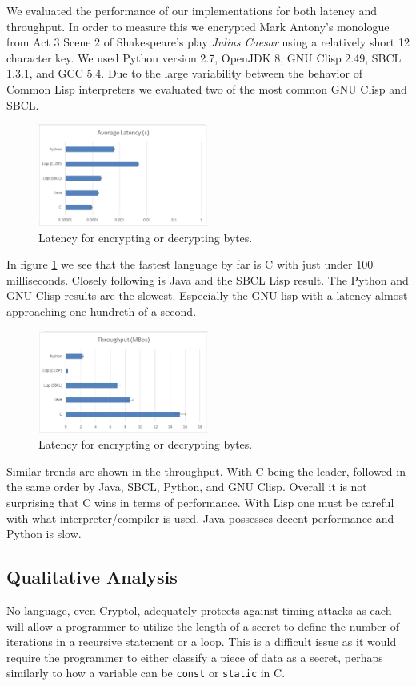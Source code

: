 We evaluated the performance of our implementations for both latency and throughput. In order to measure this we encrypted Mark Antony's 
monologue from Act $3$ Scene $2$ of Shakespeare's play \emph{Julius Caesar} using a relatively short 12 character key. We used Python version 2.7, OpenJDK 8, GNU Clisp 2.49, SBCL 1.3.1, and GCC 5.4. Due to the large variability between the behavior of Common Lisp interpreters we evaluated 
two of the most common GNU Clisp and SBCL.

\begin{figure}
\centerline{ 
\includegraphics[width = 0.5\textwidth]{latency.PNG}}
\caption{Latency for encrypting or decrypting bytes.}
\label{fig:lan}
\end{figure}

In figure \ref{fig:lan} we see that the fastest language by far is C with just under 100 milliseconds. Closely following is Java and the SBCL Lisp result. The Python and GNU Clisp results are the slowest. Especially the GNU lisp with a latency almost approaching one hundreth of a second.

\begin{figure}
\centerline{ 
\includegraphics[width = 0.5\textwidth]{throughput.PNG}}
\caption{Latency for encrypting or decrypting bytes.}
\label{fig:ban}
\end{figure}

Similar trends are shown in the throughput. With C being the leader, followed in the same order by Java, SBCL, Python, and GNU Clisp. Overall it is not surprising that C wins in terms of performance. With Lisp one must be careful with what interpreter/compiler is used. Java possesses decent performance and Python is slow.

\subsection{Qualitative Analysis}

No language, even Cryptol, adequately protects against timing attacks as each will allow a programmer to utilize the length of a secret 
to define the number of iterations in a recursive statement or a loop. This is a difficult issue as it would require the programmer to 
either classify a piece of data as a secret, perhaps similarly to how a variable can be \texttt{const} or \texttt{static} in C.
